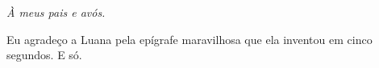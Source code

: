 \imprimircapa


\setcounter{page}{3}
\imprimirfolhaderosto*




\newpage
\vspace*{\fill}
\begin{center}
    
\end{center}
\vspace*{\fill}
\newpage
% 
\cleardoublepage


\begin{dedicatoria}
    \vspace*{\fill}
    \centering
    \noindent
    \textit{À meus pais e avós.}
    \vspace*{\fill}
\end{dedicatoria}

\begin{agradecimentos}
    Eu agradeço a Luana pela epígrafe maravilhosa que ela inventou em cinco segundos.
    E só.
\end{agradecimentos}


